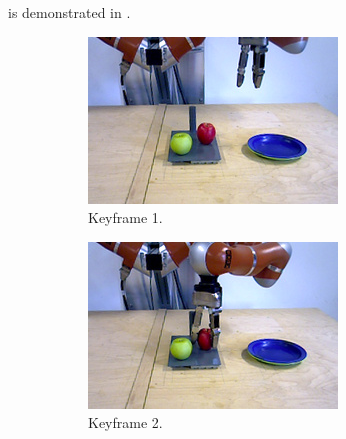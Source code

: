 is demonstrated in .

\begin{figure}
  \centering
  \begin{subfigure}[t]{0.475\textwidth}
    \includegraphics[width=\textwidth]{./figures/sec/planning/exec2/frame0511.jpg}
    \caption{Keyframe 1.}
    \label{fig:sec_usingaffordanceforplanning_results_scenario2_1}
  \end{subfigure}
  \hfill
  \begin{subfigure}[t]{0.475\textwidth}
    \includegraphics[width=\textwidth]{./figures/sec/planning/exec2/frame0837.jpg}
    \caption{Keyframe 2.}
    \label{fig:sec_usingaffordanceforplanning_results_scenario2_2}
  \end{subfigure}\\%
  \begin{subfigure}[t]{0.475\textwidth}

\end{subfigure}
\end{figure}
